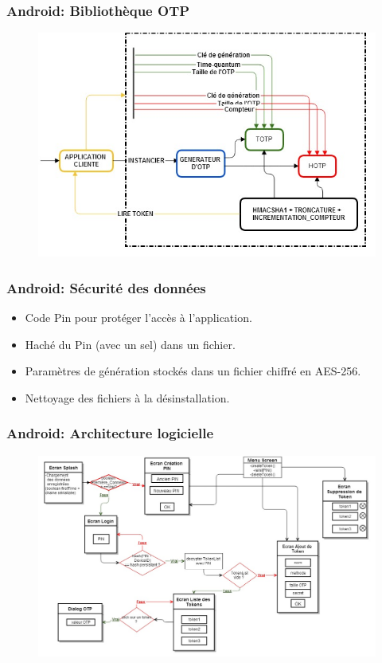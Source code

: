 \documentclass[xcolor=table]{beamer}
\begin{document}
\begin{frame}
\frametitle{Android: Bibliothèque OTP}
\begin{figure}
 \includegraphics[scale=0.40]{../graphics/libotp-android.jpg} 
\end{figure}
\end{frame}

\begin{frame}
\frametitle{Android: Sécurité des données}
\begin{itemize}
\item Code Pin pour protéger l'accès à l'application.
\item Haché du Pin (avec un sel) dans un fichier.
\item Paramètres de génération stockés dans un fichier chiffré en AES-256.
\item Nettoyage des fichiers à la désinstallation.
\end{itemize}
\end{frame}





\begin{frame}
\frametitle{Android: Architecture logicielle}
\begin{figure}
 \includegraphics[scale=0.3]{../graphics/archi-android.jpg} 
\end{figure}

\end{frame}
\end{document}
